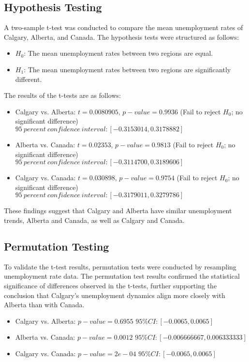 \documentclass[11pt]{article}
\begin{document}
\subsection{Hypothesis Testing}
A two-sample t-test was conducted to compare the mean unemployment rates of Calgary, Alberta, and Canada. The hypothesis tests were structured as follows:

\begin{itemize}
    \item $H_0$: The mean unemployment rates between two regions are equal.
    \item $H_1$: The mean unemployment rates between two regions are significantly different.
\end{itemize}

The results of the t-tests are as follows:
\begin{itemize}
    \item Calgary vs. Alberta: $t = 0.0080905$, $p-value = 0.9936$ (Fail to reject $H_0$; no significant difference)\newline
        $95\ percent \ confidence\ interval:[-0.3153014 ,   0.3178882]$ 
    \item Alberta vs. Canada: $t = 0.02353$, $p-value = 0.9813$ (Fail to reject $H_0$; no significant difference)\newline
        $95\ percent\ confidence\ interval:[ -0.3114700, 0.3189606]$
    \item Calgary vs. Canada: $t = 0.030898$, $p-value = 0.9754$ (Fail to reject $H_0$; no significant difference)\newline
        $95\ percent\ confidence\ interval:[-0.3179011, 0.3279786]$
\end{itemize}
These findings suggest that Calgary and Alberta have similar unemployment trends, Alberta and Canada, as well as Calgary and Canada.
\subsection{Permutation Testing}
To validate the t-test results, permutation tests were conducted by resampling unemployment rate data. The permutation test results confirmed the statistical significance of differences observed in the t-tests, further supporting the conclusion that Calgary's unemployment dynamics align more closely with Alberta than with Canada.
\begin{itemize}
    \item Calgary vs. Alberta:  $p-value = 0.6955$ \newline
     $95\% CI: [-0.0065, 0.0065]$ 
    \item Alberta vs. Canada: $p-value = 0.0012$  \newline
     $95\% CI: [-0.006666667, 0.006333333]$
    \item Calgary vs. Canada: $p-value = 2e-04$ \newline
     $95\% CI: [-0.0065, 0.0065]$
\end{itemize}
\end{document}
